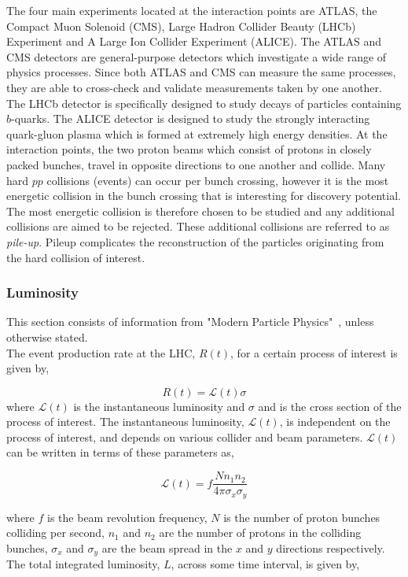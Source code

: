 The four main experiments located at the interaction points are ATLAS, the Compact Muon Solenoid (CMS), Large Hadron Collider Beauty (LHCb) Experiment and A Large Ion Collider Experiment (ALICE). The ATLAS and CMS detectors are general-purpose detectors which investigate a wide range of physics processes. Since both ATLAS and CMS can measure the same processes, they are able to cross-check and validate measurements taken by one another. The LHCb detector is specifically designed to study decays of particles containing $b$-quarks. The ALICE detector is designed to study the strongly interacting quark-gluon plasma which is formed at extremely high energy densities. At the interaction points, the two proton beams which consist of protons in closely packed bunches, travel in opposite directions to one another and collide. Many hard $pp$ collisions (events) can occur per bunch crossing, however it is the most energetic collision in the bunch crossing that is interesting for discovery potential. The most energetic collision is therefore chosen to be studied and any additional collisions are aimed to be rejected. These additional collisions are referred to as \textit{pile-up}. Pileup complicates the reconstruction of the particles originating from the hard collision of interest. 

\subsubsection{Luminosity}
This section consists of information from "Modern Particle Physics"~\cite{thomson2013modern}, unless otherwise stated.\\

The event production rate at the LHC, $R(t)$, for a certain process of interest is given by, 

\begin{equation}
R(t) = \mathcal{L}(t)\sigma
\end{equation}
where $\mathcal{L}(t)$ is the instantaneous luminosity and $\sigma$ and is the cross section of the process of interest. The instantaneous luminosity, $\mathcal{L}(t)$, is independent on the process of interest, and depends on various collider and beam parameters. $\mathcal{L}(t)$ can be written in terms of these parameters as,

\begin{equation}
\mathcal{L}(t) = f \frac{N n_{1} n_{2}}{4\pi \sigma_{x} \sigma_{y}}
\end{equation}

where $f$ is the beam revolution frequency, $N$ is the number of proton bunches colliding per second, $n_{1}$ and $n_{2}$ are the number of protons in the colliding bunches, $\sigma_{x}$ and $\sigma_{y}$ are the beam spread in the $x$ and $y$ directions respectively. The total integrated luminosity, $L$, across some time interval, is given by,

